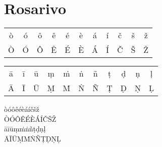 \section{Rosarivo}

\RosarivoFont

\noindent
\begin{tabular}{ccccccccccc}
ò & ó & ô & ê & é & è & á & í & č & š & ž\\
Ò & Ó & Ô & Ê & É & È & Á & Í & Č & Š & Ž\\
\end{tabular}

\noindent
\begin{tabular}{ccccccccccc}
ā & ī & ū & ṃ & ṁ & ṅ & ñ & ṭ & ḍ & ṇ & ḷ\\
Ā & Ī & Ū & Ṃ & Ṁ & Ṅ & Ñ & Ṭ & Ḍ & Ṇ & Ḷ\\
\end{tabular}

\noindent
òóôêéèáíčšž\\
ÒÓÔÊÉÈÁÍČŠŽ\\
āīūṃṁṅñṭḍṇḷ\\
ĀĪŪṂṀṄÑṬḌṆḶ

